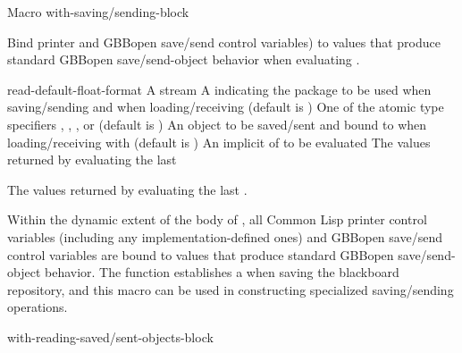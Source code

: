 \documentclass[10pt,twoside,english,pdftex]{article}
\begin{document}
\begin{functiondoc}{Macro}%
  {with-saving/sending-block}%
  {\code{(} 
    }
  
\fnsyntax

\fnpurpose Bind printer and GBBopen save/send control variables) to
values that produce standard GBBopen save/send-object behavior when
evaluating .

\fnpackage {}

\fnmodule {}

\fnargs
\begin{args}{read-default-float-format}
\arg[stream] A stream
\arg[package] A  indicating the package to
be used when saving/sending and when loading/receiving (default is
)
 One of the atomic type specifiers
, ,
, or  (default is
)
\arg[value] An object to be saved/sent and bound to
 when loading/receiving with
 (default is \nil)
\arg[forms] An implicit  of  to be evaluated
\arg[results] The values returned by evaluating the last 
\end{args}

\fnreturns The values returned by evaluating the last .

\fndescription Within the dynamic extent of the body of ,
all Common Lisp printer control variables (including any
implementation-defined ones) and GBBopen save/send control variables are bound
to values that produce standard GBBopen save/send-object behavior.  The
function  establishes a
 when saving the blackboard
repository, and this macro can be used in constructing specialized
saving/sending operations.

\begin{alsos}{with-reading-saved/sent-objects-block}
\end{alsos}

\end{functiondoc}
\end{document}
